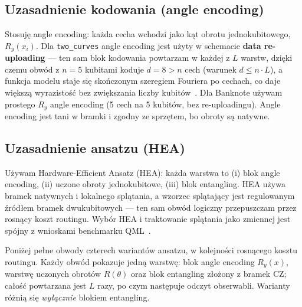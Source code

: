 \documentclass[11pt,a4paper]{article}
\begin{document}
\subsection{Uzasadnienie kodowania (angle encoding)}

Stosuję angle encoding: każda cecha wchodzi jako kąt obrotu jednokubitowego, $R_y(x_i)$.
Dla \texttt{two\_curves} angle encoding jest użyty w schemacie \textbf{data re-uploading} ---
ten sam blok kodowania powtarzam w każdej z $L$ warstw, dzięki czemu obwód z $n=5$ kubitami
koduje $d=8 > n$ cech (warunek $d \le n\cdot L$), a funkcja modelu staje się skończonym
szeregiem Fouriera po cechach, co daje większą wyrazistość bez zwiększania liczby
kubitów~\cite{bowles2024}. Dla Banknote używam prostego $R_y$ angle encoding (5 cech na
5 kubitów, bez re-uploadingu). Angle encoding jest tani w bramki i zgodny ze sprzętem, bo
obroty są natywne.

\subsection{Uzasadnienie ansatzu (HEA)}

Używam Hardware-Efficient Ansatz (HEA): każda warstwa to (i) blok angle encoding, (ii) uczone
obroty jednokubitowe, (iii) blok entangling. HEA używa bramek natywnych i lokalnego splątania,
a wzorzec splątający jest regulowanym źródłem bramek dwukubitowych --- ten sam obwód logiczny
przepuszczam przez rosnący koszt routingu. Wybór HEA i traktowanie splątania jako zmiennej
jest spójny z wnioskami benchmarku QML~\cite{bowles2024}.

Poniżej pełne obwody czterech wariantów ansatzu, w kolejności rosnącego kosztu routingu.
Każdy obwód pokazuje jedną warstwę: blok angle encoding $R_y(x)$, warstwę uczonych obrotów
$R(\theta)$ oraz blok entangling złożony z bramek CZ; całość powtarzana jest $L$ razy, po
czym następuje odczyt obserwabli. Warianty różnią się \emph{wyłącznie} blokiem entangling.
\end{document}
